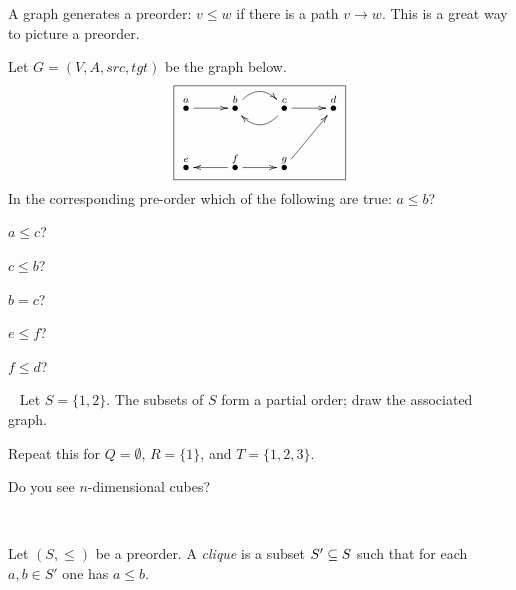 \begin{remarkRUS}\label{rem:preorder to graph}
\end{remarkRUS}

\begin{sloganENG}
A graph generates a preorder: $v\leq w$ if there is a path $v\to w$. This is a great way to picture a preorder. 
\end{sloganENG}

\begin{sloganRUS}
\end{sloganRUS}

\begin{exerciseENG}
Let $G=(V,A,src,tgt)$ be the graph below. 
$$\fbox{\xymatrix{
\LMO{a}\ar[r]&\LMO{b}\ar@/^1pc/[r]&\LMO{c}\ar@/^1pc/[l]\ar[r]&\LMO{d}\\
\LMO{e}&\LMO{f}\ar[l]\ar[r]&\LMO{g}\ar[ur]}}
$$
In the corresponding pre-order which of the following are true: 
\sexc $a\leq b$?
\item $a\leq c$?
\item $c\leq b$?
\item $b=c$?
\item $e\leq f$?
\item $f\leq d$?
\endsexc
\end{exerciseENG}

\begin{exerciseRUS}
\end{exerciseRUS}

\begin{exerciseENG}\label{exc:power poset}~
\sexc Let $S=\{1,2\}$. The subsets of $S$ form a partial order; draw the associated graph. 
\item Repeat this for $Q=\emptyset$, $R=\{1\}$, and $T=\{1,2,3\}$. 
\item Do you see $n$-dimensional cubes?
\endsexc
\end{exerciseENG}

\begin{exerciseRUS}\label{exc:power poset}~
\end{exerciseRUS}

\begin{definitionENG}\label{def:clique}
Let $(S,\leq)$ be a preorder. A {\em clique} is a subset $S'\ss S$ such that for each $a,b\in S'$ one has $a\leq b$.
\end{definitionENG}

\begin{definitionRUS}\label{def:clique}
\end{definitionRUS}


